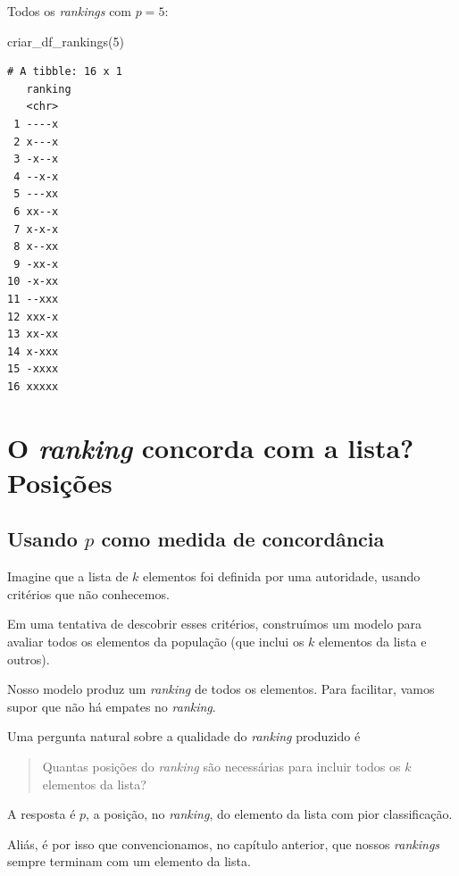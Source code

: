 \documentclass[
  letterpaper,
  DIV=11,
  numbers=noendperiod]{scrreprt}
\newenvironment{Shaded}{\begin{snugshade}}{\end{snugshade}}
\newcommand{\DecValTok}[1]{\textcolor[rgb]{0.68,0.00,0.00}{#1}}
\newcommand{\FunctionTok}[1]{\textcolor[rgb]{0.28,0.35,0.67}{#1}}
\newcommand{\NormalTok}[1]{\textcolor[rgb]{0.00,0.23,0.31}{#1}}
\begin{document}
Todos os \emph{rankings} com $p = 5$:

\begin{Shaded}
\begin{Highlighting}[]
\FunctionTok{criar\_df\_rankings}\NormalTok{(}\DecValTok{5}\NormalTok{)}
\end{Highlighting}
\end{Shaded}

\begin{verbatim}
# A tibble: 16 x 1
   ranking
   <chr>  
 1 ----x  
 2 x---x  
 3 -x--x  
 4 --x-x  
 5 ---xx  
 6 xx--x  
 7 x-x-x  
 8 x--xx  
 9 -xx-x  
10 -x-xx  
11 --xxx  
12 xxx-x  
13 xx-xx  
14 x-xxx  
15 -xxxx  
16 xxxxx  
\end{verbatim}


\chapter{\texorpdfstring{O \emph{ranking} concorda com a lista?
Posições}{O ranking concorda com a lista? Posições}}\label{o-ranking-concorda-com-a-lista-posiuxe7uxf5es}

\section{\texorpdfstring{Usando $p$ como medida de
concordância}{Usando  como medida de concordância}}\label{usando-p}

Imagine que a lista de $k$ elementos foi definida por uma autoridade,
usando critérios que não conhecemos.

Em uma tentativa de descobrir esses critérios, construímos um modelo
para avaliar todos os elementos da população (que inclui os $k$
elementos da lista e outros).

Nosso modelo produz um \emph{ranking} de todos os elementos. Para
facilitar, vamos supor que não há empates no \emph{ranking}.

Uma pergunta natural sobre a qualidade do \emph{ranking} produzido é

\begin{quote}
Quantas posições do \emph{ranking} são necessárias para incluir todos os
$k$ elementos da lista?
\end{quote}

A resposta é $p$, a posição, no \emph{ranking}, do elemento da lista com
pior classificação.

Aliás, é por isso que convencionamos, no capítulo anterior, que nossos
\emph{rankings} sempre terminam com um elemento da lista.
\end{document}
